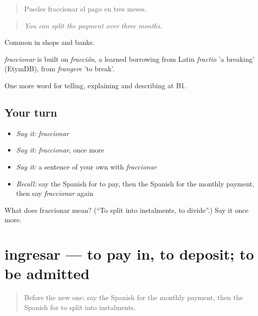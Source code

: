 \begin{quote}
Puedes fraccionar el pago en tres meses.
\end{quote}

\begin{quote}
\emph{You can split the payment over three months.}
\end{quote}

Common in shops and banks.

\begin{cousinweb}
\emph{fraccionar} is built on \emph{fracción}, a learned borrowing from Latin \emph{fractio} 'a breaking' (EtymDB), from \emph{frangere} 'to break'.
\end{cousinweb}

\begin{grammarlens}[title={What you've built}]
One more word for telling, explaining and describing at B1.
\end{grammarlens}

\subsection*{Your turn}
\begin{itemize}
\raggedright
  \item \emph{Say it:} \emph{fraccionar}
  \item \emph{Say it:} \emph{fraccionar}, once more
  \item \emph{Say it:} a sentence of your own with \emph{fraccionar}
  \item \emph{Recall:} say the Spanish for to pay, then the Spanish for the monthly payment, then say \emph{fraccionar} again
\end{itemize}

\begin{tcolorbox}[breakable,colback=teal!4,colframe=teal!35!black,title={Before you move on}]
What does fraccionar mean? (\textquotedblleft{}To split into instalments, to divide\textquotedblright{}.) Say it once more.
\end{tcolorbox}
\section[ingresar]{ingresar — to pay in, to deposit; to be admitted}

\label{lesson:ES-C632-ingresar}



\begin{quote}
Before the new one: say the Spanish for the monthly payment, then the Spanish for to split into instalments.
\end{quote}

